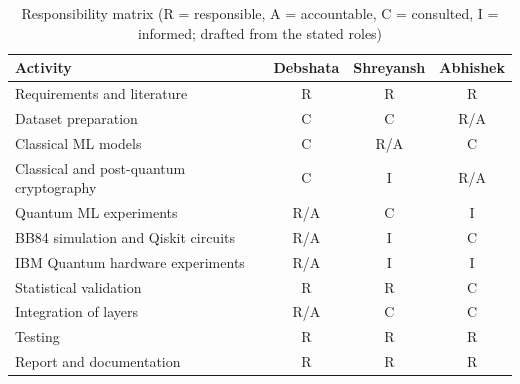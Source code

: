 \begin{table}[ht]\centering\small\caption{Responsibility matrix (R = responsible, A = accountable, C = consulted, I = informed; drafted from the stated roles)}\label{tab:raci}
\begin{tabular}{@{}p{6.2cm}ccc@{}}\toprule Activity & Debshata & Shreyansh & Abhishek\\ \midrule
Requirements and literature & R & R & R\\
Dataset preparation & C & C & R/A\\
Classical ML models & C & R/A & C\\
Classical and post-quantum cryptography & C & I & R/A\\
Quantum ML experiments & R/A & C & I\\
BB84 simulation and Qiskit circuits & R/A & I & C\\
IBM Quantum hardware experiments & R/A & I & I\\
Statistical validation & R & R & C\\
Integration of layers & R/A & C & C\\
Testing & R & R & R\\
Report and documentation & R & R & R\\
\bottomrule\end{tabular}\end{table}
